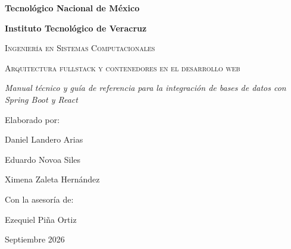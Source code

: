 \documentclass[11pt,titlepage,letterpaper,oneside]{report}
\begin{document}
	\begin{titlepage}
		\centering
		{\bfseries\LARGE Tecnol\'ogico Nacional de M\'exico \par}
		{\bfseries\LARGE Instituto Tecnol\'ogico de Veracruz \par}
		\vspace{1cm}
		{\scshape\LARGE Ingenier\'ia en Sistemas Computacionales \par}
		
		\vfill
		
		{\scshape\huge Arquitectura fullstack y contenedores en el desarrollo web \par}
		{\itshape\LARGE Manual t\'ecnico y gu\'ia de referencia para la integraci\'on de bases de datos con Spring Boot y React \par}
		
		\vfill
		
		{\Large Elaborado por: \par}
		{\Large Daniel Landero Arias \par}
		{\Large Eduardo Novoa Siles \par}
		{\Large Ximena Zaleta Hern\'andez \par}
		\vspace{0.5cm}
		{\Large Con la asesor\'ia de: \par}
		{\Large Ezequiel Piña Ortiz \par}
		
		\vfill
		
		{\Large Septiembre 2026 \par}
	\end{titlepage}
	
	\tableofcontents
	\newpage
	
	
	
	
	
	
	
	
	
	\clearpage
	\printbibliography[title={Referencias Bibliogr\'aficas}, heading=bibintoc]
	
\end{document}
